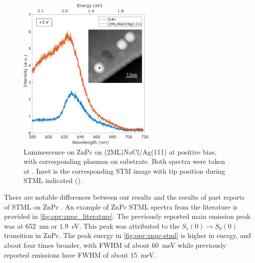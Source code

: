 


                    

\begin{figure} [H]
    \centering
    
        \includegraphics[width=0.6\textwidth]{pictures/znpc_+ve_emission_inset.png}
    
    \caption{Luminescence on ZnPc on (2ML)NaCl/Ag(111) at positive bias, with corresponding plasmon on substrate. Both spectra were taken at . Inset is the corresponding STM image with tip position during STML indicated (). }
    \label{fig:opv:znpc-stml}
\end{figure}

There are notable differences between our results and the results of past reports of \ac{STML} on ZnPc \citep{Zhang2016, Doppagne2017, Zhang2017, Doppagne2018}. An example of ZnPc \ac{STML} spectra from the literature is provided in \autoref{fig:opv:znpc_literature}. The previously reported main emission peak was at \SI{652}{nm} or \SI{1.9}{eV}. This peak was attributed to the $S_1(0) \rightarrow S_0(0)$ transition in ZnPc. The peak energy in \autoref{fig:opv:znpc-stml} is higher in energy, and about four times broader, with \ac{FWHM} of about \SI{60}{meV} while previously reported emissions have \ac{FWHM} of about \SI{15}{meV}.

